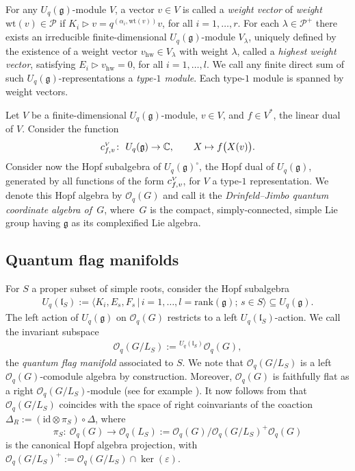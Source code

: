 \documentclass[10pt,a4paper]{amsart}
\numberwithin{equation}{section}
\newcommand{\e}{\varepsilon}
\begin{document}
For any $U_q(\mathfrak{g})$-module $V$, a vector $v\in V$ is called a \emph{weight vector} of \emph{weight}~$\mathrm{wt}(v) \in \mathcal{P}$ if
$K_i \triangleright v = q^{(\alpha_i,\mathrm{wt}(v))} v$, for all $i=1,\ldots,r$.
For each $\lambda \in\mathcal{P}^+$ there exists an irreducible finite-dimensional $U_q(\mathfrak{g})$-module $V_\lambda$, uniquely defined by the existence of a weight vector $v_{\mathrm{hw}}\in V_\lambda$ with weight $\lambda$, called a {\em highest weight vector}, satisfying
$E_i \triangleright v_{\mathrm{hw}}=0$,
for all $i = 1, \dots, l$. We call any finite direct sum of such $U_q(\mathfrak{g})$-representations a {\em type-$1$ module}.
Each type-$1$ module is spanned by weight vectors.

Let $V$ be a finite-dimensional $U_q(\mathfrak{g})$-module, $v \in V$, and $f \in V^*$, the linear dual of $V$. Consider the function
\begin{gather*}
c^{\textrm{\tiny $V$}}_{f,v}\colon \ U_q(\mathfrak{g}) \to \mathbb{C}, \qquad X \mapsto f\big(X(v)\big).
\end{gather*}
Consider now the Hopf subalgebra of $U_q(\mathfrak{g})^\circ$, the Hopf dual of $U_q(\mathfrak{g})$, generated by all functions of the form $c^{\textrm{\tiny $V$}}_{f,v}$, for $V$ a type-$1$ representation. We denote this Hopf algebra by $\mathcal{O}_q(G)$ and call it the {\em Drinfeld--Jimbo quantum coordinate algebra of~$G$}, where~$G$ is the compact, simply-connected, simple Lie group having $\mathfrak{g}$ as its complexified Lie algebra.

\subsection{Quantum flag manifolds}\label{section2.5}

For $S$ a proper subset of simple roots, consider the Hopf subalgebra
\begin{gather*}
U_q(\mathfrak{l}_S) := \big\langle K_i, E_s, F_s \,|\, i = 1, \ldots, l = \mathrm{rank}(\mathfrak{g}); \, s \in S \big\rangle \subseteq U_q(\mathfrak{g}).
\end{gather*}
The left action of $U_q(\mathfrak{g})$ on $\mathcal{O}_q(G)$ restricts to a left $U_q(\mathfrak{l}_S)$-action. We call the invariant subspace
\begin{gather*}
\mathcal{O}_q(G/L_S) := {}^{U_q(\mathfrak{l}_S)}\mathcal{O}_q(G),
\end{gather*}
the \emph{quantum flag manifold} associated to $S$. We note that $\mathcal{O}_q(G/L_S)$ is a left $\mathcal{O}_q(G)$-comodule algebra by construction. Moreover, $\mathcal{O}_q(G)$ is faithfully flat as a right $\mathcal{O}_q(G/L_S)$-module (see for example \cite[Section~5.4]{GAPP}). It now follows from \cite[Theorem~1]{Tak} that $\mathcal{O}_q(G/L_S)$ coincides with the space of right coinvariants of the coaction $\Delta_R := ( \mathrm{id}\otimes\pi_S) \circ \Delta$, where
\[
\pi_S\colon \ \mathcal{O}_q(G) \to \mathcal{O}_q(L_S) := \mathcal{O}_q(G)/\mathcal{O}_q(G/L_S)^+\mathcal{O}_q(G)
\]
is the canonical Hopf algebra projection, with $\mathcal{O}_q(G/L_S)^+:=\mathcal{O}_q(G/L_S) \cap \ker(\e)$.
\end{document}

